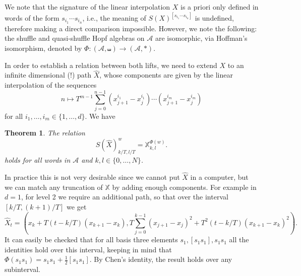\documentclass[10pt, reqno]{article}
\theoremstyle{definition}
\theoremstyle{plain}
\newtheorem{theorem}{Theorem}
\newcommand{\A}{\mathcal{A}}
\newcommand{\bbX}{\mathbb{X}}
\begin{document}
We note that the signature of the linear interpolation \(X\) is a priori only defined in words of the form
\(s_{i_1}\dotsm s_{i_n}\), i.e., the meaning of \(S(X)^{[s_{i_1}\dotsm s_{i_n}]}\) is undefined, therefore making a
direct comparison impossible.
However, we note the following: the shuffle and quasi-shuffle Hopf algebras on \(\A\) are isomorphic, via Hoffman's
isomorphism, denoted by \(\Phi\colon(\A,\shuffle)\to(\A,*)\).

In order to establish a relation between both lifts, we need to extend \(X\) to an infinite dimensional (!) path \(\hat{X}\), 
whose components are given by the linear interpolation of the sequences
\[
	n\mapsto T^{m-1}\sum_{j=0}^{n-1}(x_{j+1}^{i_1}-x_j^{i_1})\dotsm(x_{j+1}^{i_m}-x_j^{i_m})
\]
for all \(i_1,\dotsc,i_m\in\{1,\dotsc,d\}\).
We have
\begin{theorem}
	The relation
	\[
		S(\hat{X})^w_{k/T,l/T}=\bbX^{\Phi(w)}_{k,l}.
	\]
	holds for all words in \(\A\) and \(k,l\in\{0,\dotsc,N\}\).
\end{theorem}

In practice this is not very desirable since we cannot put \(\hat{X}\) in a computer, but we can match any truncation of
\(\bbX\) by adding enough components.
For example in \(d=1\), for level 2 we require an additional path, so that over the interval \([k/T, (k+1)/T]\) we get
\[
	\hat{X}_t = \left(x_{k}+T(t-k/T)(x_{k+1}-x_k), T\sum_{j=0}^{k-1}(x_{j+1}-x_j)^2+T^2(t-k/T)(x_{k+1}-x_k)^2\right).
\]
It can easily be checked that for all basis three elements \(s_1, [s_1s_1], s_1s_1\) all the identities hold over this
interval, keeping in mind that \(\Phi(s_1s_1)=s_1s_1+\tfrac12[s_1s_1]\).
By Chen's identity, the result holds over any subinterval.
\end{document}
